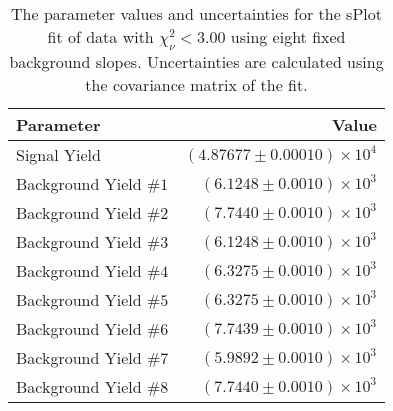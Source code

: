 
\begin{table}[ht]
    \begin{center}
        \begin{tabular}{lr}\toprule
            Parameter & Value \\\midrule
            Signal Yield & $(4.87677 \pm 0.00010) \times 10^{4}$ \\
            Background Yield $\#1$ & $(6.1248 \pm 0.0010) \times 10^{3}$ \\
            Background Yield $\#2$ & $(7.7440 \pm 0.0010) \times 10^{3}$ \\
            Background Yield $\#3$ & $(6.1248 \pm 0.0010) \times 10^{3}$ \\
            Background Yield $\#4$ & $(6.3275 \pm 0.0010) \times 10^{3}$ \\
            Background Yield $\#5$ & $(6.3275 \pm 0.0010) \times 10^{3}$ \\
            Background Yield $\#6$ & $(7.7439 \pm 0.0010) \times 10^{3}$ \\
            Background Yield $\#7$ & $(5.9892 \pm 0.0010) \times 10^{3}$ \\
            Background Yield $\#8$ & $(7.7440 \pm 0.0010) \times 10^{3}$ \\\bottomrule
        \end{tabular}
        \caption{The parameter values and uncertainties for the sPlot fit of data with $\chi^2_\nu < 3.00$ using eight fixed background slopes. Uncertainties are calculated using the covariance matrix of the fit.}\label{tab:splot-fit-results-chisqdof-3.00-fixed-8}
    \end{center}
\end{table}

